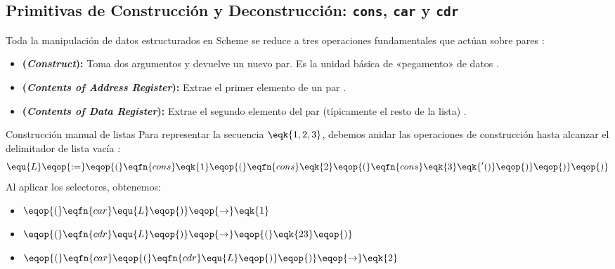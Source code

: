 \subsection{Primitivas de Construcción y Deconstrucción: \texttt{cons}, \texttt{car} y \texttt{cdr}}
\label{subsec:4_3_1_primitivas}

Toda la manipulación de datos estructurados en Scheme se reduce a tres operaciones fundamentales que actúan sobre pares \cite{SICP}:

\begin{itemize}
    \item \textbf{ (\textit{Construct}):} Toma dos argumentos y devuelve un nuevo par. Es la unidad básica de «pegamento» de datos \cite{SICP}.
    \item \textbf{ (\textit{Contents of Address Register}):} Extrae el primer elemento de un par \cite{SICP}.
    \item \textbf{ (\textit{Contents of Data Register}):} Extrae el segundo elemento del par (típicamente el resto de la lista) \cite{SICP}.
\end{itemize}

\begin{ejemplo}{Construcción manual de listas}
Para representar la secuencia $\eqk{1, 2, 3}$, debemos anidar las operaciones de construcción hasta alcanzar el delimitador de lista vacía  \cite{SICP}:
\begin{equation}
    \equ{L} \eqop{:=} \eqop{(}\eqfn{cons} \eqk{1} \eqop{(}\eqfn{cons} \eqk{2} \eqop{(}\eqfn{cons} \eqk{3} \eqk{'()}\eqop{)}\eqop{)}\eqop{)}
\end{equation}
Al aplicar los selectores, obtenemos:
\begin{itemize}
    \item $\eqop{(}\eqfn{car} \equ{L}\eqop{)} \eqop{\rightarrow} \eqk{1}$
    \item $\eqop{(}\eqfn{cdr} \equ{L}\eqop{)} \eqop{\rightarrow} \eqop{(}\eqk{2 3}\eqop{)}$
    \item $\eqop{(}\eqfn{car} \eqop{(}\eqfn{cdr} \equ{L}\eqop{)}\eqop{)} \eqop{\rightarrow} \eqk{2}$
\end{itemize}
\end{ejemplo}

